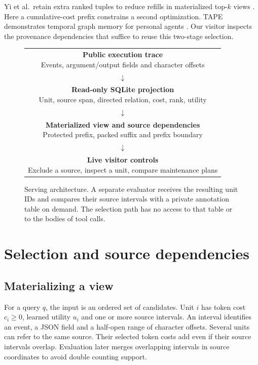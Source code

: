 \documentclass[conference]{IEEEtran}
\begin{document}
Yi et al.\ retain extra ranked tuples to reduce refills in materialized top-$k$ views \cite{topk}. Here a cumulative-cost prefix constrains a second optimization. TAPE demonstrates temporal graph memory for personal agents \cite{tape}. Our visitor inspects the provenance dependencies that suffice to reuse this two-stage selection.

\begin{figure}[t]
\centering
\setlength{\fboxsep}{4pt}
\begin{tabular}{@{}c@{}}
\fcolorbox{forest}{white}{\parbox{.88\columnwidth}{\centering \textbf{Public execution trace}\\Events, argument/output fields and character offsets}}\\
$\downarrow$\\
\fcolorbox{forest}{white}{\parbox{.88\columnwidth}{\centering \textbf{Read-only SQLite projection}\\Unit, source span, directed relation, cost, rank, utility}}\\
$\downarrow$\\
\fcolorbox{forest}{white}{\parbox{.88\columnwidth}{\centering \textbf{Materialized view and source dependencies}\\Protected prefix, packed suffix and prefix boundary}}\\
$\downarrow$\\
\fcolorbox{forest}{white}{\parbox{.88\columnwidth}{\centering \textbf{Live visitor controls}\\Exclude a source, inspect a unit, compare maintenance plans}}\\
\end{tabular}
\caption{Serving architecture. A separate evaluator receives the resulting unit IDs and compares their source intervals with a private annotation table on demand. The selection path has no access to that table or to the bodies of tool calls.}
\label{fig:system}
\end{figure}

\section{Selection and source dependencies}

\subsection{Materializing a view}
For a query $q$, the input is an ordered set of candidates. Unit $i$ has token cost $c_i\geq 0$, learned utility $u_i$ and one or more source intervals. An interval identifies an event, a JSON field and a half-open range of character offsets. Several units can refer to the same source. Their selected token costs add even if their source intervals overlap. Evaluation later merges overlapping intervals in source coordinates to avoid double counting support.
\end{document}
